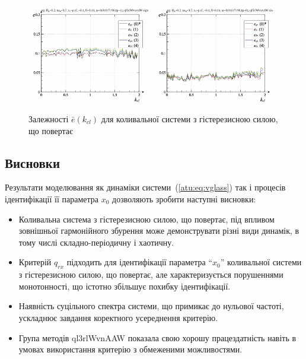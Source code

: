 \begin{figure}[ht!]
\begin{center}
  \includegraphics[width=0.49\textwidth]{p/cha/vg/vg_id-p_k_cl_sign.png}
  \hfill
  \includegraphics[width=0.49\textwidth]{p/cha/vg/vg_id-p_k_cl_sin.png}
\end{center}
  \caption{Залежності $\bar{e}(k_{cl})$ для коливальної системи з гістерезисною силою, що повертає}
\label{atu:f:vg_e_k_cl}
\end{figure}





\subsection{Висновки} %

Результати моделювання як динаміки системи~(\ref{atu:eq:vglass}) так і
процесів ідентифікації її параметра
$ x_0 $ дозволяють зробити наступні висновки:

\begin{itemize}

  \item
    Коливальна система з гістерезисною силою, що повертає,
    під впливом
    зовнішньої гармонійного збурення може демонструвати різні
    види динамік, в тому числі складно-періодичну і хаотичну.


  \item
    Критерій
    $ q_{rx} $ підходить для ідентифікації параметра ``$x_0$'' коливальної
    системи з гістерезисною силою, що повертає, але характеризується порушеннями
    монотонності, що істотно збільшує похибку ідентифікації.

  \item
    Наявність суцільного спектра системи, що примикає до нульової
    частоті, ускладнює завдання коректного усереднення критерію.

  \item
    Група методів ql3rlWvnAAW показала свою хорошу працездатність навіть
    в умовах використання критерію з обмеженими можливостями.


\end{itemize}


